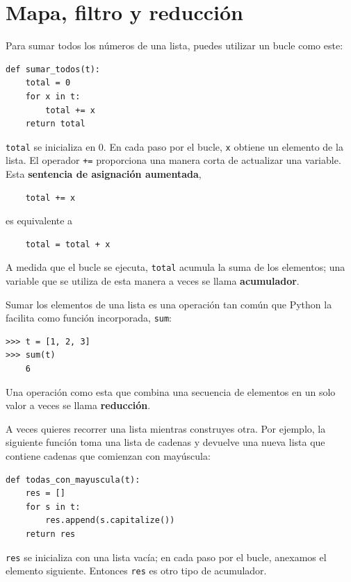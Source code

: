\documentclass[10pt]{book}
\begin{document}
\section{Mapa, filtro y reducción}
\label{filter}

Para sumar todos los números de una lista, puedes utilizar un bucle como este:


\begin{verbatim}
def sumar_todos(t):
    total = 0
    for x in t:
        total += x
    return total
\end{verbatim}
%
{\tt total} se inicializa en 0.  En cada paso por el bucle,
{\tt x} obtiene un elemento de la lista.  El operador {\tt +=}
proporciona una manera corta de actualizar una variable.  Esta
{\bf sentencia de asignación aumentada},

\begin{verbatim}
    total += x
\end{verbatim}
%
es equivalente a

\begin{verbatim}
    total = total + x
\end{verbatim}
%
A medida que el bucle se ejecuta, {\tt total} acumula la suma de los
elementos; una variable que se utiliza de esta manera a veces se llama
{\bf acumulador}.

Sumar los elementos de una lista es una operación tan común
que Python la facilita como función incorporada, {\tt sum}:

\begin{verbatim}
>>> t = [1, 2, 3]
>>> sum(t)
    6
\end{verbatim}
%
Una operación como esta que combina una secuencia de elementos en
un solo valor a veces se llama {\bf reducción}.

A veces quieres recorrer una lista mientras construyes
otra.  Por ejemplo, la siguiente función toma una lista de cadenas
y devuelve una nueva lista que contiene cadenas que comienzan con mayúscula:

\begin{verbatim}
def todas_con_mayuscula(t):
    res = []
    for s in t:
        res.append(s.capitalize())
    return res
\end{verbatim}
%
{\tt res} se inicializa con una lista vacía; en cada paso por el bucle,
anexamos el elemento siguiente.  Entonces {\tt res} es otro
tipo de acumulador.
\end{document}
